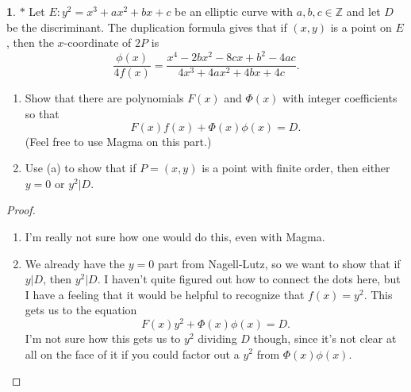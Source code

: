 \documentclass[12pt]{article}
\theoremstyle{definition}
\newtheorem{ex}{}
\begin{document}
\begin{ex}
	$*$ Let $E : y^{2} = x^{3} + ax^{2} + bx + c$ be an elliptic curve with $a, b, c \in \mathbb{Z}$ and let $D$ be the discriminant.
	The duplication formula gives that if $(x,y)$ is a point on $E$, then the $x$-coordinate of $2P$ is \begin{equation*}
		\frac{\phi(x)}{4 f(x)} = \frac{x^{4} - 2bx^{2} - 8cx + b^{2} - 4ac}{4x^{3} + 4ax^{2} + 4bx + 4c}.
	\end{equation*}
	\begin{enumerate}[label=(\alph*)]

		\item Show that there are polynomials $F(x)$ and $\Phi(x)$ with integer coefficients so that \begin{equation*}
			      F(x) f(x) + \Phi(x) \phi(x) = D.
		      \end{equation*}
		      (Feel free to use Magma on this part.)

		\item Use (a) to show that if $P = (x,y)$ is a point with finite order, then
		      either $y = 0$ or $y^{2} | D.$
	\end{enumerate}
\end{ex}
\begin{proof}\
  \begin{enumerate}[label=(\alph*)]
    \item I'm really not sure how one would do this, even with Magma.
    \item We already have the $y = 0$ part from Nagell-Lutz, so we want to show that if $y | D$, then $y^2 | D$.
      I haven't quite figured out how to connect the dots here, but I have a feeling that it would be helpful to recognize that $f(x) = y^2$.
      This gets us to the equation \begin{equation*}
        F(x)y^2 + \Phi(x)\phi(x) = D.
      \end{equation*}
      I'm not sure how this gets us to $y^2$ dividing $D$ though, since it's not clear at all on the face of it if you could factor out a $y^2$ from $\Phi(x)\phi(x)$.
  \end{enumerate}
\end{proof}
\end{document}
